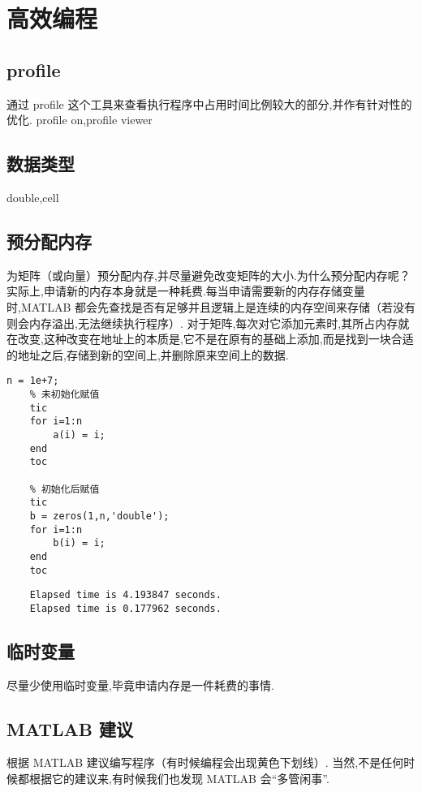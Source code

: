 \section{高效编程}

\subsection{profile}
 通过 profile 这个工具来查看执行程序中占用时间比例较大的部分,并作有针对性的优化. profile on,profile viewer %

\subsection{数据类型}
 double,cell

\subsection{预分配内存}
 为矩阵（或向量）预分配内存,并尽量避免改变矩阵的大小.为什么预分配内存呢？实际上,申请新的内存本身就是一种耗费.每当申请需要新的内存存储变量时,MATLAB 都会先查找是否有足够并且逻辑上是连续的内存空间来存储（若没有则会内存溢出,无法继续执行程序）. 对于矩阵,每次对它添加元素时,其所占内存就在改变,这种改变在地址上的本质是,它不是在原有的基础上添加,而是找到一块合适的地址之后,存储到新的空间上,并删除原来空间上的数据.

  \vspace{-0.8cm}
  \begin{lstlisting}[caption = 预分配内存]
    n = 1e+7;
    % 未初始化赋值
    tic
    for i=1:n
        a(i) = i;
    end
    toc

    % 初始化后赋值
    tic
    b = zeros(1,n,'double');
    for i=1:n
        b(i) = i;
    end
    toc
  \end{lstlisting}

  \vspace{-0.8cm}
  \begin{lstlisting}
    Elapsed time is 4.193847 seconds.
    Elapsed time is 0.177962 seconds.
  \end{lstlisting}

\subsection{临时变量}
 尽量少使用临时变量,毕竟申请内存是一件耗费的事情.

\subsection{MATLAB 建议}
 根据 MATLAB 建议编写程序（有时候编程会出现黄色下划线）. 当然,不是任何时候都根据它的建议来,有时候我们也发现 MATLAB 会“多管闲事”.

